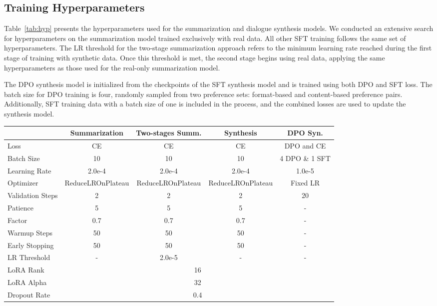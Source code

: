 \subsection{Training Hyperparameters}
Table~\ref{tab:hyp} presents the hyperparameters used for the summarization and dialogue synthesis models. We conducted an extensive search for hyperparameters on the summarization model trained exclusively with real data. All other SFT training follows the same set of hyperparameters. The LR threshold for the two-stage summarization approach refers to the minimum learning rate reached during the first stage of training with synthetic data. Once this threshold is met, the second stage begins using real data, applying the same hyperparameters as those used for the real-only summarization model.

The DPO synthesis model is initialized from the checkpoints of the SFT synthesis model and is trained using both DPO and SFT loss. The batch size for DPO training is four, randomly sampled from two preference sets: format-based and content-based preference pairs. Additionally, SFT training data with a batch size of one is included in the process, and the combined losses are used to update the synthesis model.


\begin{table*}[htbp]
\centering
\caption{Hyper-parameters used for training dialogue summarization, two-stage dialogue summarization, dialogue/summary synthesis, and DPO-based dialogue synthesis models.}
\label{tab:hyp}
\begin{tabular}{@{} lcccc @{}}
\toprule
 & Summarization & Two-stages Summ. & Synthesis & DPO Syn. \\
\midrule
Loss & CE & CE & CE & DPO and CE \\
Batch Size & 10 & 10 & 10 & 4 DPO \& 1 SFT  \\
Learning Rate & 2.0e-4 & 2.0e-4 & 2.0e-4 & 1.0e-5 \\ 
Optimizer & ReduceLROnPlateau  & ReduceLROnPlateau  & ReduceLROnPlateau & Fixed LR \\ 
Validation Steps & 2 & 2 & 2 & 20 \\
Patience & 5 & 5 & 5 & - \\
Factor & 0.7 & 0.7 & 0.7 & - \\
Warmup Steps &  50 & 50 & 50 & - \\ 
Early Stopping &50 & 50 & 50 & - \\ 
LR Threshold & - & 2.0e-5 & - & - \\\hline
LoRA Rank &  \multicolumn{4}{c}{16} \\  
LoRA Alpha & \multicolumn{4}{c}{32} \\ 
Dropout Rate & \multicolumn{4}{c}{0.4} \\
\bottomrule
\end{tabular}
\end{table*}